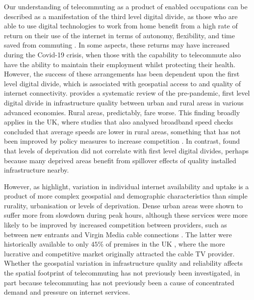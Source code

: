 \documentclass[]{interact}
\theoremstyle{plain}%
\theoremstyle{definition}
\theoremstyle{remark}
\begin{document}
Our understanding of telecommuting as a product of enabled occupations
can be described as a manifestation of the third level digital divide,
as those who are able to use digital technologies to work from home
benefit from a high rate of return on their use of the internet in terms
of autonomy, flexibility, and time saved from commuting
\citep{peters2004employees, siha2006telecommuting, singh2013modeling}.
In some aspects, these returns may have increased during the Covid-19
crisis, when those with the capability to telecommute also have the
ability to maintain their employment whilst protecting their health.
However, the success of these arrangements has been dependent upon the
first level digital divide, which is associated with geospatial access
to and quality of internet connectivity. \citet{SALEMINK2017360}
provides a systematic review of the pre-pandemic, first level digital
divide in infrastructure quality between urban and rural areas in
various advanced economies. Rural areas, predictably, fare worse. This
finding broadly applies in the UK, where studies that also analysed
broadband speed checks concluded that average speeds are lower in rural
areas, something that has not been improved by policy measures to
increase competition
\citep{riddlesden2014broadband, nardotto2015unbundling}. In contrast,
\citet{riddlesden2014broadband} found that levels of deprivation did not
correlate with first level digital divides, perhaps because many
deprived areas benefit from spillover effects of quality installed
infrastructure nearby.

However, as \citet{blank2018local} highlight, variation in individual
internet availability and uptake is a product of more complex geospatial
and demographic characteristics than simple rurality, urbanisation or
levels of deprivation. Dense urban areas were shown to suffer more from
slowdown during peak hours, although these services were more likely to
be improved by increased competition between providers, such as between
new entrants and Virgin Media cable connections
\citep{riddlesden2014broadband, nardotto2015unbundling}. The latter were
historically available to only \(45\)\% of premises in the UK
\citep{ofcom2016}, where the more lucrative and competitive market
originally attracted the cable TV provider. Whether the geospatial
variation in infrastructure quality and reliability affects the spatial
footprint of telecommuting has not previously been investigated, in part
because telecommuting has not previously been a cause of concentrated
demand and pressure on internet services.
\end{document}
